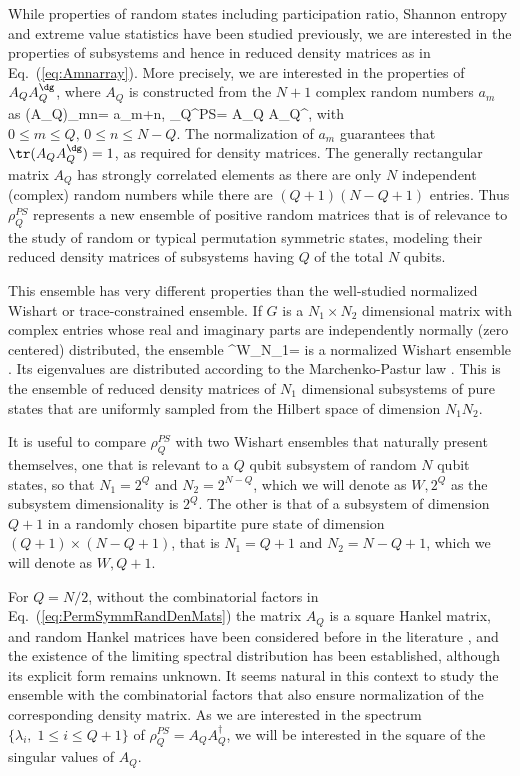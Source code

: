 \documentclass[pre,aps,showpacs,showkeys,twocolumn]{revtex4-1}
\theoremstyle{definition}
\theoremstyle{remark}
\begin{document}
While properties of random states including participation ratio, Shannon entropy \cite{Haake} and extreme value statistics \cite{lakshminarayan2008} have been studied previously, we are interested in the properties of subsystems and hence in reduced density matrices as in Eq.~(\ref{eq:Amnarray}). More precisely, we are interested in the properties of $A_Q A_Q^{\dg}$, where $A_Q$ is constructed from the $N + 1$ complex random numbers $a_m$ as
\beq
\label{eq:PermSymmRandDenMats}
(A_Q)_{mn}=\; a_{m+n}, \;\; \rho_Q^{PS}= A_Q A_Q^{\dagger},
\eeq
with $0\le m \le Q, \, 0\le n \le N-Q$.
The normalization of $a_m$ guarantees that $\tr(A_Q A_Q^{\dg}) = 1$, as required for density matrices. 
The generally rectangular matrix $A_Q$ has strongly correlated elements as there are only $N$ independent (complex) random numbers while there are $(Q+1)(N-Q+1)$ entries. Thus $\rho^{PS}_{Q}$ represents a new ensemble of positive random matrices that is of relevance to the study of random or typical permutation symmetric states, modeling their reduced density matrices of subsystems having $Q$ of the total $N$ qubits. 

This ensemble has very different properties than the well-studied normalized Wishart or trace-constrained ensemble. 
If $G$ is a $ N_1 \times N_2$ dimensional matrix with complex entries whose real and imaginary parts are independently normally (zero centered) distributed, the ensemble
\beq
\label{eq:Wishart}
\rho^W_{N_1}=
\eeq
is a normalized Wishart ensemble \cite{wishart1928generalised}. Its eigenvalues are distributed according to the Marchenko-Pastur law \cite{marvcenko1967distribution}. This is the ensemble of reduced density matrices of $N_1$ dimensional subsystems of pure states that are uniformly sampled from the Hilbert space of dimension $N_1 N_2$.

It is useful to compare $\rho^{PS}_Q$ with two Wishart ensembles that naturally present themselves, one that is relevant to a $Q$ qubit subsystem of random $N$ qubit states, so that $N_1=2^Q$ and $N_2=2^{N-Q}$, which we will denote as $W, 2^Q$ as the subsystem dimensionality is $2^Q$. The other is that of a subsystem of dimension $Q + 1$ in a randomly chosen bipartite pure state of dimension $(Q + 1)\times (N - Q + 1)$, that is $N_1=Q+1$ and $N_2=N-Q+1$, which we will denote as $W, Q + 1$.

For $Q = N/2$, without the combinatorial factors in Eq.~(\ref{eq:PermSymmRandDenMats}) the matrix $A_Q$ is a square Hankel matrix, and random Hankel matrices have been considered before in the literature \cite{bryc2006}, and the existence of the limiting spectral distribution has been established, although its explicit form remains unknown. It seems natural in this context to study the ensemble with the combinatorial factors that also ensure normalization of the corresponding density matrix. As we are interested in the spectrum $\{ \lambda_i, \; 1\le i \le Q+1\}$ of $\rho^{PS}_Q=A_Q A_Q^{\dagger}$, we will be interested in the square of the singular values of $A_Q$.
\end{document}
